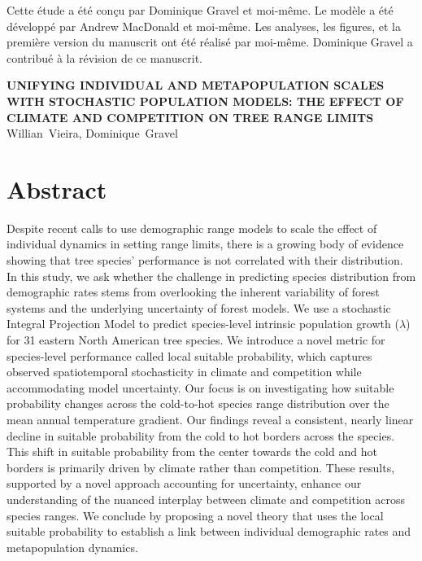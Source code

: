 Cette étude a été conçu par Dominique Gravel et moi-même. Le modèle a
été développé par Andrew MacDonald et moi-même. Les analyses, les
figures, et la première version du manuscrit ont été réalisé par
moi-même. Dominique Gravel a contribué à la révision de ce manuscrit.

\vfill{}
\pagebreak

\begin{center}
\textbf{\MakeUppercase{Unifying individual and metapopulation scales
with stochastic population models: the effect of climate and competition
on tree range limits}} \\
Willian~Vieira, Dominique~Gravel
\end{center}

\section{Abstract}

Despite recent calls to use demographic range models to scale the effect
of individual dynamics in setting range limits, there is a growing body
of evidence showing that tree species' performance is not correlated
with their distribution. In this study, we ask whether the challenge in
predicting species distribution from demographic rates stems from
overlooking the inherent variability of forest systems and the
underlying uncertainty of forest models. We use a stochastic Integral
Projection Model to predict species-level intrinsic population growth
(\(\lambda\)) for 31 eastern North American tree species. We introduce a
novel metric for species-level performance called local suitable
probability, which captures observed spatiotemporal stochasticity in
climate and competition while accommodating model uncertainty. Our focus
is on investigating how suitable probability changes across the
cold-to-hot species range distribution over the mean annual temperature
gradient. Our findings reveal a consistent, nearly linear decline in
suitable probability from the cold to hot borders across the species.
This shift in suitable probability from the center towards the cold and
hot borders is primarily driven by climate rather than competition.
These results, supported by a novel approach accounting for uncertainty,
enhance our understanding of the nuanced interplay between climate and
competition across species ranges. We conclude by proposing a novel
theory that uses the local suitable probability to establish a link
between individual demographic rates and metapopulation dynamics.

